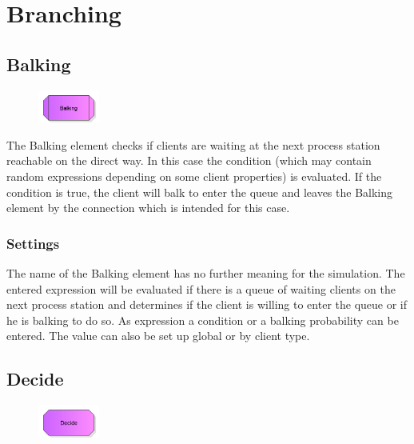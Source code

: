 \chapter{Branching}

\section{Balking}
\label{ref:ModelElementBalking}

\begin{figure}
\vspace{-22pt}
\includegraphics[width=2cm]{imageModelElementBalking.png}
\vspace{-22pt}
\end{figure}

The Balking element checks if clients are waiting at the next process station reachable
on the direct way. In this case the condition (which may contain random expressions depending
on some client properties) is evaluated. If the condition is true, the client will balk to
enter the queue and leaves the Balking element by the connection which is intended for this
case.

\subsection*{Settings}

The name of the Balking element has no further meaning for the simulation.
The entered expression will be evaluated if there is a queue of waiting
clients on the next process station and determines if the client is willing
to enter the queue or if he is balking to do so. As expression a condition or
a balking probability can be entered. The value can also be set up global or
by client type.


\section{Decide}
\label{ref:ModelElementDecide}

\begin{figure}
\vspace{-22pt}
\includegraphics[width=2cm]{imageModelElementDecide.png}
\vspace{-22pt}
\end{figure}

